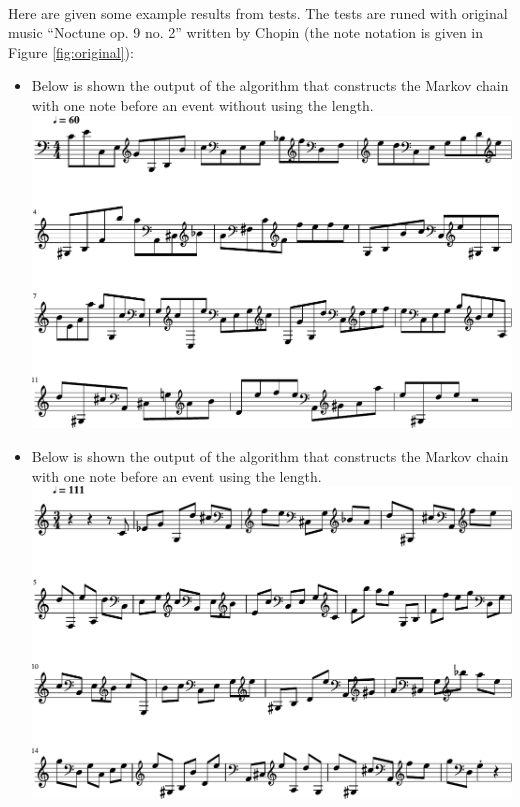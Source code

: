 \documentclass[]{article}
\begin{document}
        \paragraph{}Here are given some example results from tests. The tests are runed with original music ``Noctune op. 9 no. 2'' written by Chopin (the note notation is given in Figure \ref{fig:original}):
        \begin{itemize}
            \item Below is shown the output of the algorithm that constructs the Markov chain with one note before an event without using the length.\\
            \includegraphics[scale=0.6]{result_one_note}
            \item Below is shown the output of the algorithm that constructs the Markov chain with one note before an event using the length.\\
            \includegraphics[scale=0.6]{result_one_note_time}

\end{itemize}
\end{document}

